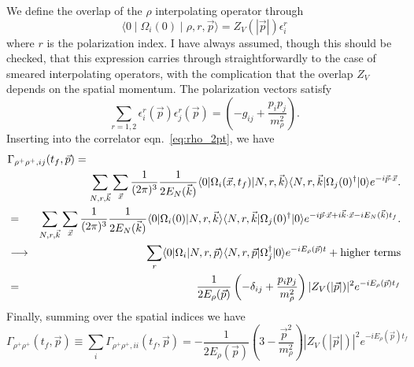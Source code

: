\documentclass[12pt]{article}
\newcommand{\pdotx}{\vec{p} \cdot \vec{x}}
\begin{document}
We define the overlap of the $\rho$ interpolating operator through
\begin{equation}
\langle 0 \mid \Omega_i(0) \mid \rho, r,\vec{p} \rangle = Z_V(|\vec{p}|)
\epsilon_i^r
\end{equation}
where $r$ is the polarization index.  I have always assumed, though
this should be checked, that this expression carries through
straightforwardly to the case of smeared interpolating operators, with
the complication that the overlap $Z_V$ depends on the spatial
momentum.  The polarization vectors satisfy
\begin{equation}
\sum_{r = 1,2} \epsilon_i^r(\vec{p}) \epsilon_j^r(\vec{p}) = \left(-
  g_{ij} + \frac{p_i p_j}{m_{\rho}^2}\right).
\end{equation}
Inserting into the correlator eqn.~\ref{eq:rho_2pt}, we have
\begin{eqnarray}
  \lefteqn{\Gamma_{\rho^+ \rho^+, ij}(t_f, \vec{p}) = } &  &\nonumber\\
&  & \sum_{N,r,\vec{k}}
\sum_{\vec{x}} \frac{1}{(2\pi)^3} \frac{1}{2 E_N(\vec{k})} \langle 0 |
\Omega_i(\vec{x}, t_f) | N,r,\vec{k} \rangle \langle N,r,\vec{k} |
\Omega_j(0)^{\dagger}|0 \rangle e^{-i\pdotx}.\nonumber\\
& = & \sum_{N,r,\vec{k}}
\sum_{\vec{x}} \frac{1}{(2\pi)^3} \frac{1}{2 E_N(\vec{k})} \langle 0 |
\Omega_i(0) | N,r,\vec{k} \rangle \langle N,r,\vec{k} |
\Omega_j(0)^{\dagger}|0 \rangle e^{-i\pdotx +i \vec{k}\cdot\vec{x} - i
E_N(\vec{k}) t_f}.\nonumber\\
& \longrightarrow & \sum_r \langle 0 |
\Omega_i | N,r,\vec{p} \rangle \langle N,r,\vec{p} |
\Omega_j^{\dagger}|0 \rangle e^{-i E_{\rho}(\vec{p}) t} + \mbox{higher
  terms}\nonumber \\
& = & \frac{1}{2 E_\rho(\vec{p})} \left( -\delta_{ij} + \frac{p_i
    p_j}{m_{\rho}^2} \right) |Z_V(|\vec{p}|)|^2 e^{-i E_{\rho}(\vec{p}
    )t_f}
\end{eqnarray}
Finally, summing over the spatial indices we have
\begin{equation}
\Gamma_{\rho^+ \rho^+}(t_f, \vec{p}) \equiv \sum_i \Gamma_{\rho^+
  \rho^+, ii}(t_f, \vec{p}) = -\frac{1}{2 E_{\rho}(\vec{p})} \left( 3 -
  \frac{\vec{p}^2}{m_{\rho}^2} \right) |Z_V(|\vec{p}|)|^2 e^{-i
  E_{\rho}(\vec{p}) t_f }
\end{equation}
\end{document}
